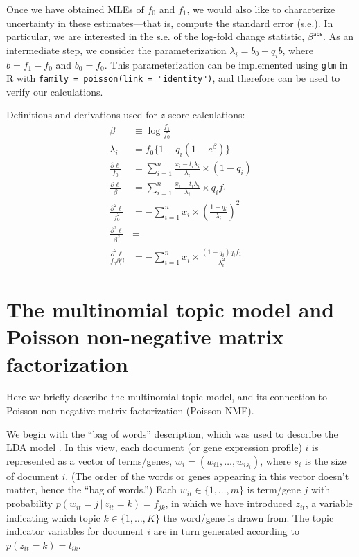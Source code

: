 \documentclass[final]{siamart171218}
\begin{document}
Once we have obtained MLEs of $f_0$ and $f_1$, we would also like to
characterize uncertainty in these estimates---that is, compute the
standard error (s.e.). In particular, we are interested in the s.e. of
the log-fold change statistic, $\beta^{\mathsf{abs}}$. As an
intermediate step, we consider the parameterization $\lambda_i = b_0 +
q_i b$, where $b = f_1 - f_0$ and $b_0 = f_0$. This parameterization
can be implemented using {\tt glm} in R with {\tt family =
  poisson(link = "identity")}, and therefore can be used to verify our
calculations.

Definitions and derivations used for $z$-score calculations:
\begin{align}
\beta     &\equiv \log\frac{f_1}{f_0} \\
\lambda_i &= f_0\{1 - q_i(1-e^{\beta})\} \\
\frac{\partial\ell}{f_0} &= 
\sum_{i=1}^n \frac{x_i - t_i\lambda_i}{\lambda_i} \times (1-q_i) \\
\frac{\partial\ell}{\beta} &= 
\sum_{i=1}^n \frac{x_i - t_i\lambda_i}{\lambda_i} \times q_i f_1 \\
\frac{\partial^2\ell}{f_0^2} &=
-\sum_{i=1}^n x_i \times \left(\frac{1-q_i}{\lambda_i}\right)^2 \\
\frac{\partial^2\ell}{\beta^2} &= \\
\frac{\partial^2\ell}{f_0\partial\beta} &= 
-\sum_{i=1}^n x_i \times \frac{(1-q_i) q_i f_1}{\lambda_i^2}
\end{align}

\section{The multinomial topic model and Poisson non-negative matrix
  factorization}

Here we briefly describe the multinomial topic model, and its
connection to Poisson non-negative matrix factorization (Poisson NMF).

We begin with the ``bag of words'' description, which was used to
describe the LDA model \cite{blei-2003}. In this view, each document
(or gene expression profile) $i$ is represented as a vector of
terms/genes, $w_i = (w_{i1}, \ldots, w_{is_i})$, where $s_i$ is the
size of document $i$. (The order of the words or genes appearing in
this vector doesn't matter, hence the ``bag of words.'') Each $w_{it}
\in \{1, \ldots, m\}$ is term/gene $j$ with probability
$p(w_{it} = j \,|\, z_{it} = k) = f_{jk}$, in which we have introduced
$z_{it}$, a variable indicating which topic $k \in \{1, \ldots, K\}$
the word/gene is drawn from. The topic indicator variables for
document $i$ are in turn generated according to $p(z_{it} = k) =
l_{ik}$.
\end{document}
